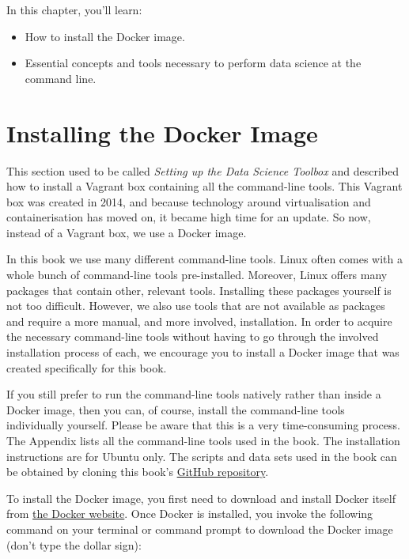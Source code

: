 \documentclass[
]{book}
\providecommand{\tightlist}{%
  \setlength{\itemsep}{0pt}\setlength{\parskip}{0pt}}
\theoremstyle{definition}
\theoremstyle{definition}
\theoremstyle{definition}
\theoremstyle{remark}
\begin{document}
In this chapter, you'll learn:

\begin{itemize}
\tightlist
\item
  How to install the Docker image.
\item
  Essential concepts and tools necessary to perform data science at the command line.
\end{itemize}

\hypertarget{docker-image}{%
\section{Installing the Docker Image}\label{docker-image}}

\begin{rmdnote}
This section used to be called \emph{Setting up the Data Science Toolbox} and described how to install a Vagrant box containing all the command-line tools. This Vagrant box was created in 2014, and because technology around virtualisation and containerisation has moved on, it became high time for an update. So now, instead of a Vagrant box, we use a Docker image.
\end{rmdnote}

In this book we use many different command-line tools. Linux often comes with a whole bunch of command-line tools pre-installed. Moreover, Linux offers many packages that contain other, relevant tools. Installing these packages yourself is not too difficult. However, we also use tools that are not available as packages and require a more manual, and more involved, installation. In order to acquire the necessary command-line tools without having to go through the involved installation process of each, we encourage you to install a Docker image that was created specifically for this book.

\begin{rmdtip}
If you still prefer to run the command-line tools natively rather than inside a Docker image, then you can, of course, install the command-line tools individually yourself. Please be aware that this is a very time-consuming process. The Appendix lists all the command-line tools used in the book. The installation instructions are for Ubuntu only. The scripts and data sets used in the book can be obtained by cloning this book's \href{https://github.com/jeroenjanssens/data-science-at-the-command-line}{GitHub repository}.
\end{rmdtip}

To install the Docker image, you first need to download and install Docker itself from \href{https://www.docker.com/products/docker}{the Docker website}.
Once Docker is installed, you invoke the following command on your terminal or command prompt to download the Docker image (don't type the dollar sign):
\end{document}
